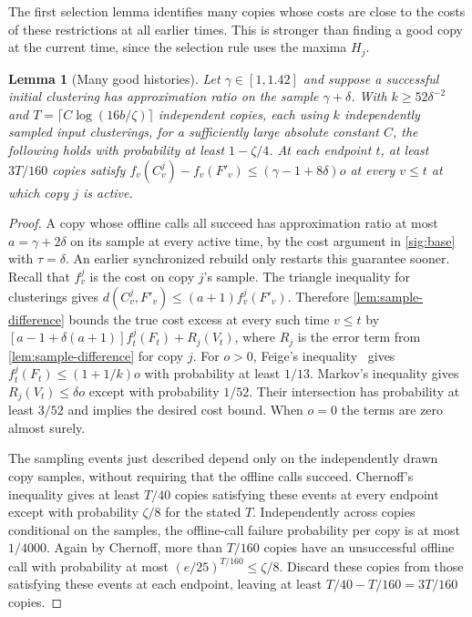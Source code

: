 \documentclass[11pt]{article}
\newtheorem{lemma}[theorem]{Lemma}
\begin{document}
The first selection lemma identifies many copies whose
costs are close to the costs of these restrictions at all earlier times. This is
stronger than finding a good copy at
the current time, since the selection rule uses the maxima $H_j$.

\begin{lemma}[Many good histories]\label{lem:online-training}
Let $\gamma\in[1,1.42]$ and suppose a successful initial clustering has approximation
ratio on the sample $\gamma+\delta$. With $k\ge52\delta^{-2}$ and
$T=\lceil C\log(16b/\zeta)\rceil$ independent copies, each using $k$
independently sampled input clusterings, for a sufficiently large
absolute constant $C$, the following holds with
probability at least $1-\zeta/4$. At each endpoint $t$, at least
$3T/160$ copies satisfy
$f_v(C^j_v)-f_v(F'_v)\le(\gamma-1+8\delta)o$ at every $v\le t$ at which copy $j$ is active.
\end{lemma}
\begin{proof}
A copy whose offline calls all succeed has
approximation ratio at most $a=\gamma+2\delta$ on its sample at every
active time, by the cost argument in \cref{sig:base} with
$\tau=\delta$. An earlier synchronized rebuild only restarts this
guarantee sooner. Recall that $f_v^j$ is the cost on copy $j$'s sample.
The triangle inequality for clusterings gives
$d(C^j_v,F'_v)\le(a+1)f^j_v(F'_v)$. Therefore
\cref{lem:sample-difference} bounds the true cost excess at
every such time $v\le t$ by
$[a-1+\delta(a+1)]f^j_t(F_t)+R_j(V_t)$, where $R_j$ is the
error term from \cref{lem:sample-difference} for copy $j$. For $o>0$, Feige's inequality~\cite{Feige}
gives $f^j_t(F_t)\le(1+1/k)o$ with probability at least $1/13$.
Markov's inequality gives $R_j(V_t)\le\delta o$ except with
probability $1/52$. Their intersection has probability at least
$3/52$ and implies the desired cost bound. When $o=0$ the terms
are zero almost surely.

The sampling events just described depend only on the independently
drawn copy samples, without requiring that the offline calls succeed. Chernoff's
inequality gives at least $T/40$ copies satisfying these events at every endpoint
except with probability $\zeta/8$ for the stated $T$. Independently
across copies conditional on the samples, the offline-call failure probability
per copy is at most $1/4000$. Again by Chernoff, more than $T/160$
copies have an unsuccessful offline call with probability at most
$(e/25)^{T/160}\le\zeta/8$. Discard these copies from those satisfying these events at each endpoint, leaving at least $T/40-T/160=3T/160$ copies.
\end{proof}
\end{document}
